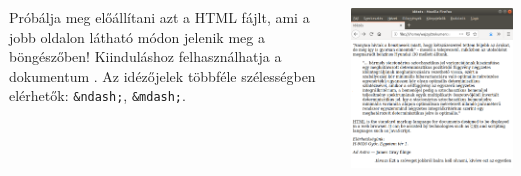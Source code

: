 \begin{frame}
  \begin{columns}[c]
      Próbálja meg előállítani azt a HTML fájlt, ami a jobb oldalon látható módon jelenik meg a böngészőben!
      Kiinduláshoz felhasználhatja a dokumentum .
      Az idézőjelek többféle szélességben elérhetők: \texttt{\&ndash;}, \texttt{\&mdash;}.
      \begin{center}
        \begin{exampleblock}{}
          \centering \includegraphics[scale=.23]{idezes.png}
        \end{exampleblock}
      \end{center}
  \end{columns}
\end{frame}
